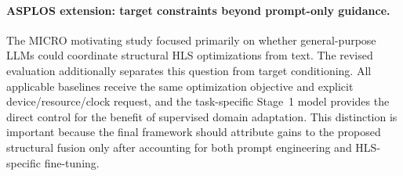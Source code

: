 

\paragraph{ASPLOS extension: target constraints beyond prompt-only guidance.}
The MICRO motivating study focused primarily on whether general-purpose LLMs could coordinate structural HLS optimizations from text. The revised evaluation additionally separates this question from target conditioning. All applicable baselines receive the same optimization objective and explicit device/resource/clock request, and the task-specific Stage~1 model provides the direct control for the benefit of supervised domain adaptation. This distinction is important because the final framework should attribute gains to the proposed structural fusion only after accounting for both prompt engineering and HLS-specific fine-tuning.

